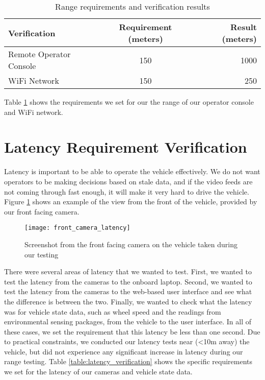 \begin{table}[ht]
    \centering
    \begin{tabular}{ l | c | r }
      Verification & Requirement (meters) & Result (meters) \\ \hline
      Remote Operator Console & 150 & 1000 \\
      WiFi Network & 150 & 250 \\
    \end{tabular}
    \caption{Range requirements and verification results}
    \label{table:range_verification}
\end{table}

Table \ref{table:range_verification} shows the requirements we set for our the range of our operator console and WiFi network.

\section{Latency Requirement Verification}
Latency is important to be able to operate the vehicle effectively.  We do not want operators to be making decisions based on stale data, and if the video feeds are not coming through fast enough, it will make it very hard to drive the vehicle. Figure \ref{fig:front_camera_latency} shows an example of the view from the front of the vehicle, provided by our front facing camera. 

\begin{figure}[H]
\centerline{\texttt{[image: front\_camera\_latency]}}
\caption[]{Screenshot from the front facing camera on the vehicle taken during our testing}
\label{fig:front_camera_latency}
\end{figure}

There were several areas of latency that we wanted to test.  First, we wanted to test the latency from the cameras to the onboard laptop.  Second, we wanted to test the latency from the cameras to the web-based user interface and see what the difference is between the two.  Finally, we wanted to check what the latency was for vehicle state data, such as wheel speed and the readings from environmental sensing packages, from the vehicle to the user interface.  In all of these cases, we set the requirement that this latency be less than one second. Due to practical constraints, we conducted our latency tests near (<10m away) the vehicle, but did not experience any significant increase in latency during our range testing.  Table \ref{table:latency_verification} shows the specific requirements we set for the latency of our cameras and vehicle state data. 

